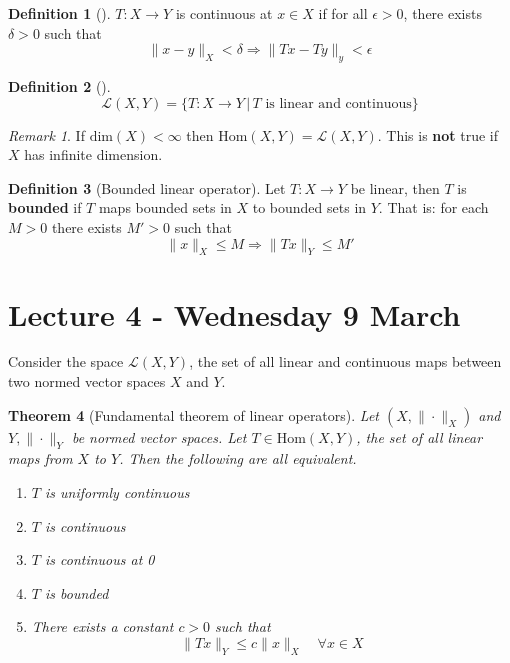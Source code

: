 \documentclass[10pt, oneside, reqno]{amsart}
\theoremstyle{plain}%
\newtheorem{thm}{Theorem}[section]
\theoremstyle{definition}
\newtheorem{defn}[thm]{Definition}
\theoremstyle{remark}
\newtheorem*{rem}{Remark}
\begin{document}
\begin{defn}[]
	$T: X \rightarrow Y$ is continuous at $x \in X$ if for all $\epsilon > 0$, there exists $\delta > 0$ such that \[
			\| x - y \|_X < \delta \Rightarrow \| Tx - Ty \|_y < \epsilon 
	\]
\end{defn}

\begin{defn}[]
	\[
	\mathcal{L}(X,Y) = \{ T:  X \rightarrow Y \, | \, \text{$T$ is linear and continuous} \}
	\]
\end{defn}

\begin{rem}
	If $\text{dim}(X) < \infty$ then $\text{Hom}(X,Y) = \mathcal{L}(X,Y)$.  This is \textbf{not} true if $X$ has infinite dimension.
\end{rem}

\begin{defn}[Bounded linear operator]
	Let $T: X \rightarrow Y$ be linear, then $T$ is \textbf{bounded} if $T$ maps bounded sets in $X$ to bounded sets in $Y$.  That is: for each $M > 0$ there exists $M' > 0$ such that \[
		\| x \|_X \leq M \Rightarrow \|Tx\|_Y \leq M'
	\]
\end{defn}

\section{Lecture 4 - Wednesday 9 March } %
\label{sec:lecture_4_}
Consider the space $\mathcal{L}(X, Y)$, the set of all linear and continuous maps between two normed vector spaces $X$ and $Y$.  

\begin{thm}[Fundamental theorem of linear operators]
	Let $( X, \| \cdot \|_X)$ and $Y, \| \cdot \|_Y$ be normed vector spaces.  Let $ T \in \text{Hom}(X,Y)$, the set of all linear maps from $X$ to $Y$.  Then the following are all equivalent.
	\begin{enumerate}[1)]
		\item $T$ is uniformly continuous
		\item $T$ is continuous
		\item $T$ is continuous at 0
		\item $T$ is bounded
		\item There exists a constant $c > 0$ such that \[
			\| Tx \|_Y \leq c \| x \|_X \quad \forall x \in X
		\]
	\end{enumerate}
\end{thm}
\end{document}
